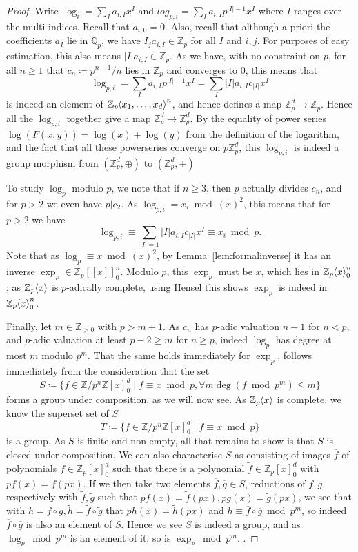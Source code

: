 \documentclass[12pt]{article}
\newcommand{\Z}{\mathbb{Z}}
\newcommand{\Q}{\mathbb{Q}}
\renewcommand{\angle}[1]{\hspace{-2pt}\left\langle #1 \right\rangle}
\theoremstyle{plain}
\theoremstyle{definition}
\theoremstyle{remark}
\begin{document}
\begin{proof}
Write $\log_{i} = \sum_{I} a_{i,I} x^I$ and $log_{p,i} = \sum_I a_{i,I} p^{|I|-1} x^I$ where $I$ ranges over the multi indices. Recall that $a_{i,0} = 0$. Also, recall that although a priori the coefficients $a_I$ lie in $\Q_p$, we have $I_j a_{i,I} \in \Z_p$ for all $I$ and $i,j$. For purposes of easy estimation, this also means $|I|a_{i,I} \in \Z_p$. As we have, with no constraint on $p$, for all $n\geq 1$ that $c_n\coloneqq p^{n-1}/n$ lies in $\Z_p$ and converges to $0$, this means that \[ \log_{p,i} = \sum_I a_{i,I} p^{|I|-1} x^I = \sum_I |I|a_{i,I} c_{|I|} x^I\] is indeed an element of $\Z_p\angle{x_1,\dots,x_d}^n$, and hence defines a map $\Z_p^d \to \Z_p$. Hence all the $\log_{p,i}$ together give a map $\Z_p^d \to \Z_p^d$. By the equality of power series $\log(F(x,y)) = \log(x)+\log(y)$ from the definition of the logarithm, and the fact that all these powerseries converge on $p\Z_p^d$, this $\log_{p,i}$ is indeed a group morphism from $(\Z_p^d,\oplus)$ to $(\Z_p^d,+)$

To study $\log_p$ modulo $p$, we note that if $n\geq 3$, then $p$ actually divides $c_n$, and for $p > 2$ we even have $p|c_2$. As $\log_{p,i} = x_i \bmod (x)^2$, this means that for $p > 2$ we have \[\log_{p,i} \equiv \sum_{|I| = 1} |I|a_{i,I}c_{|I|} x^I \equiv x_i \bmod p.\]
Note that as $\log_p \equiv x \bmod (x)^2$, by Lemma~\ref{lem:formalinverse} it has an inverse $\exp_p \in \Z_p[[x]]_0^n$. Modulo $p$, this $\exp_p$ must be $x$, which lies in $\Z_p\angle{x}_0^n$; as $\Z_p\angle{x}$ is $p$-adically complete, using Hensel this shows $\exp_p$ is indeed in $\Z_p\angle{x}_0^n$.

Finally, let $m \in \Z_{>0}$ with $p > m+1$. As $c_n$ has $p$-adic valuation $n-1$ for $n < p$, and $p$-adic valuation at least $p-2 \geq m$ for $n \geq p$, indeed $\log_p$ has degree at most $m$ modulo $p^m$. That the same holds immediately for $\exp_p$, follows immediately from the consideration that the set
\[
S \coloneqq \{f \in \Z/p^n\Z[x]_0^d \mid  f \equiv x \bmod p, \forall m \deg(f \bmod p^m) \leq m\}
\]
forms a group under composition, as we will now see. As $\Z_p\angle{x}$ is complete, we know the superset set of $S$
\[
T \coloneqq \{f \in \Z/p^n\Z[x]_0^d \mid  f \equiv x \bmod p\}
\]
is a group. As $S$ is finite and non-empty, all that remains to show is that $S$ is closed under composition. We can also characterise $S$ as consisting of images $\overline{f}$ of polynomials $f \in \Z_p[x]_0^d$ such that there is a polynomial $\tilde{f}\in\Z_p[x]_0^d$ with $pf(x) = \tilde{f}(px)$. If we then take two elements $\overline{f},\overline{g} \in S$, reductions of $f,g$ respectively with $\tilde{f},\tilde{g}$ such that $pf(x) = \tilde{f}(px), pg(x) = \tilde{g}(px)$, we see that with $h = f\circ g, \tilde{h} = \tilde{f} \circ \tilde{g}$ that $ph(x) = \tilde{h}(px)$ and $h \equiv \overline{f} \circ \overline{g} \bmod p^m$, so indeed $\overline{f} \circ \overline{g}$ is also an element of $S$. Hence we see $S$ is indeed a group, and as $\log_p \bmod p^m$ is an element of it, so is $\exp_p \bmod p^m$.
.
\end{proof}
\end{document}
